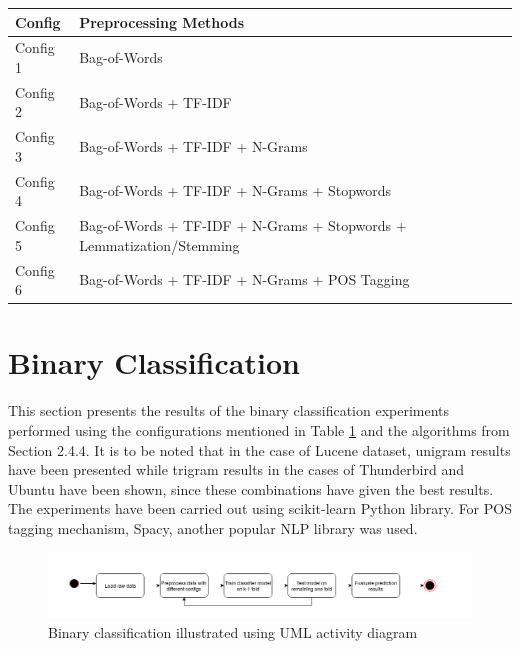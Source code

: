 \documentclass[a4paper,12pt,twoside]{report}
\begin{document}
\begin{table} %
    \centering
    \begin{adjustbox}{max width=\columnwidth}
    \def\arraystretch{1} %
    \begin{tabular}{p{2cm} p{13cm}}
        \toprule
        \textbf{Config} & \textbf{Preprocessing Methods} \\
        \midrule
			Config 1 & Bag-of-Words \\
			Config 2 & Bag-of-Words + TF-IDF \\ 
			Config 3 & Bag-of-Words + TF-IDF + N-Grams \\
			Config 4 & Bag-of-Words + TF-IDF + N-Grams + Stopwords \\
			Config 5 & Bag-of-Words + TF-IDF + N-Grams + Stopwords + Lemmatization/Stemming \\
			Config 6 & Bag-of-Words + TF-IDF + N-Grams + POS Tagging \\
        \midrule
    \end{tabular}
    \end{adjustbox}
    \label{tab:configurationNames}
\end{table} 

\section{Binary Classification}
This section presents the results of the binary classification experiments performed using the configurations mentioned in Table \ref{tab:configurationNames} and the algorithms from Section 2.4.4. It is to be noted that in the case of Lucene dataset, unigram results have been presented while trigram results in the cases of Thunderbird and Ubuntu have been shown, since these combinations have given the best results. The experiments have been carried out using scikit-learn Python library. For POS tagging mechanism, Spacy, another popular NLP library was used. 

\begin{figure}[h] %
    \centering
    \includegraphics[width=14cm]{binary-classification}
    \caption{Binary classification illustrated using UML activity diagram}
    \label{fig:binaryClass}
\end{figure}
\end{document}
